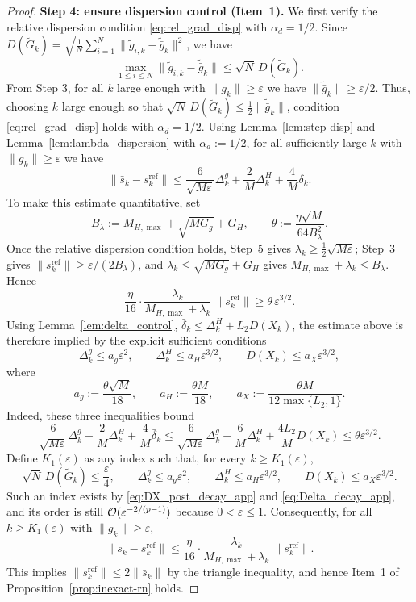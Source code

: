 \documentclass[review,onefignum,onetabnum]{siamart171218}
\begin{document}
\begin{proof}
		\smallskip
		\noindent\textbf{Step 4: ensure dispersion control (Item~1).}
		We first verify the relative dispersion condition \eqref{eq:rel_grad_disp} with $\alpha_d=1/2$.
		Since $D(\tilde G_k)=\sqrt{\frac1N\sum_{i=1}^N\|\tilde g_{i,k}-\tilde{\bar g}_k\|^2}$, we have
		\[
		\max_{1\le i\le N}\|\tilde g_{i,k}-\tilde{\bar g}_k\|
		\le \sqrt{N}\,D(\tilde G_k).
		\]
		From Step 3, for all $k$ large enough with $\|g_k\|\ge \varepsilon$ we have $\|\tilde{\bar g}_k\|\ge \varepsilon/2$.
		Thus, choosing $k$ large enough so that $\sqrt N\,D(\tilde G_k)\le \frac12\|\tilde{\bar g}_k\|$,
		condition \eqref{eq:rel_grad_disp} holds with $\alpha_d=1/2$.
		Using Lemma~\ref{lem:step-disp} and Lemma~\ref{lem:lambda_dispersion} with $\alpha_d:=1/2$,
		for all sufficiently large $k$ with $\|g_k\|\ge \varepsilon$ we have
		\[
		\|\bar s_k-s_k^{\mathrm{ref}}\|
		\le \frac{6}{\sqrt{M\varepsilon}}\Delta_k^g+\frac{2}{M}\Delta_k^H+\frac{4}{M}\bar\delta_k.
		\]
		To make this estimate quantitative, set
		\[
		B_\lambda:=M_{H,\max}+\sqrt{MG_g}+G_H,\qquad
		\theta:=\frac{\eta\sqrt M}{64B_\lambda^2}.
		\]
		Once the relative dispersion condition holds, Step~5 gives
		$\lambda_k\ge\frac12\sqrt{M\varepsilon}$; Step~3 gives
		$\|s_k^{\mathrm{ref}}\|\ge\varepsilon/(2B_\lambda)$, and
		$\lambda_k\le \sqrt{MG_g}+G_H$ gives
		$M_{H,\max}+\lambda_k\le B_\lambda$. Hence
		\[
		\frac{\eta}{16}\cdot
		\frac{\lambda_k}{M_{H,\max}+\lambda_k}\,
		\|s_k^{\mathrm{ref}}\|
		\ge \theta\,\varepsilon^{3/2}.
		\]
		Using Lemma~\ref{lem:delta_control},
		$\bar\delta_k\le \Delta_k^H+L_2D(X_k)$, the estimate above is
		therefore implied by the explicit sufficient conditions
		\[
		\Delta_k^g\le a_g\varepsilon^2,\qquad
		\Delta_k^H\le a_H\varepsilon^{3/2},\qquad
		D(X_k)\le a_X\varepsilon^{3/2},
		\]
		where
		\[
		a_g:=\frac{\theta\sqrt M}{18},\qquad
		a_H:=\frac{\theta M}{18},\qquad
		a_X:=\frac{\theta M}{12\max\{L_2,1\}}.
		\]
		Indeed, these three inequalities bound
		\[
		\frac{6}{\sqrt{M\varepsilon}}\Delta_k^g
		+\frac{2}{M}\Delta_k^H
		+\frac{4}{M}\bar\delta_k
		\le
		\frac{6}{\sqrt{M\varepsilon}}\Delta_k^g
		+\frac{6}{M}\Delta_k^H
		+\frac{4L_2}{M}D(X_k)
		\le \theta\varepsilon^{3/2}.
		\]
		Define $K_1(\varepsilon)$ as any index such that, for every
		$k\ge K_1(\varepsilon)$,
		\[
		\sqrt N\,D(\tilde G_k)\le \frac{\varepsilon}{4},\qquad
		\Delta_k^g\le a_g\varepsilon^2,\qquad
		\Delta_k^H\le a_H\varepsilon^{3/2},\qquad
		D(X_k)\le a_X\varepsilon^{3/2}.
		\]
		Such an index exists by \eqref{eq:DX_post_decay_app} and
		\eqref{eq:Delta_decay_app}, and its order is still
		$\mathcal{O}(\varepsilon^{-2/(p-1)})$ because $0<\varepsilon\le1$.
		Consequently, for all $k\ge K_1(\varepsilon)$ with
		$\|g_k\|\ge\varepsilon$,
		\[
		\|\bar s_k-s_k^{\mathrm{ref}}\|\le \frac{\eta}{16}\cdot \frac{\lambda_k}{M_{H,\max}+\lambda_k}\,\|s_k^{\mathrm{ref}}\|.
		\]
		This implies $\|s_k^{\mathrm{ref}}\|\le 2\|\bar s_k\|$ by the triangle inequality, and hence Item~1 of Proposition~\ref{prop:inexact-rn} holds.
		

\end{proof}
\end{document}
